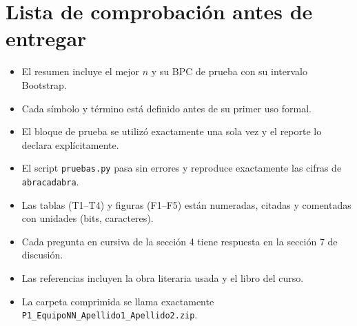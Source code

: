 \documentclass[11pt,letterpaper]{article}
\begin{document}
\section{Lista de comprobación antes de entregar}

\begin{itemize}[label=$\square$, leftmargin=1.0cm, itemsep=3pt]
    \item El resumen incluye el mejor $n$ y su BPC de prueba con su intervalo Bootstrap.
    \item Cada símbolo y término está definido antes de su primer uso formal.
    \item El bloque de prueba se utilizó exactamente una sola vez y el reporte lo declara explícitamente.
    \item El script \texttt{pruebas.py} pasa sin errores y reproduce exactamente las cifras de \texttt{abracadabra}.
    \item Las tablas (T1--T4) y figuras (F1--F5) están numeradas, citadas y comentadas con unidades (bits, caracteres).
    \item Cada pregunta en cursiva de la sección 4 tiene respuesta en la sección 7 de discusión.
    \item Las referencias incluyen la obra literaria usada y el libro del curso.
    \item La carpeta comprimida se llama exactamente \texttt{P1\_EquipoNN\_Apellido1\_Apellido2.zip}.
\end{itemize}
\end{document}

